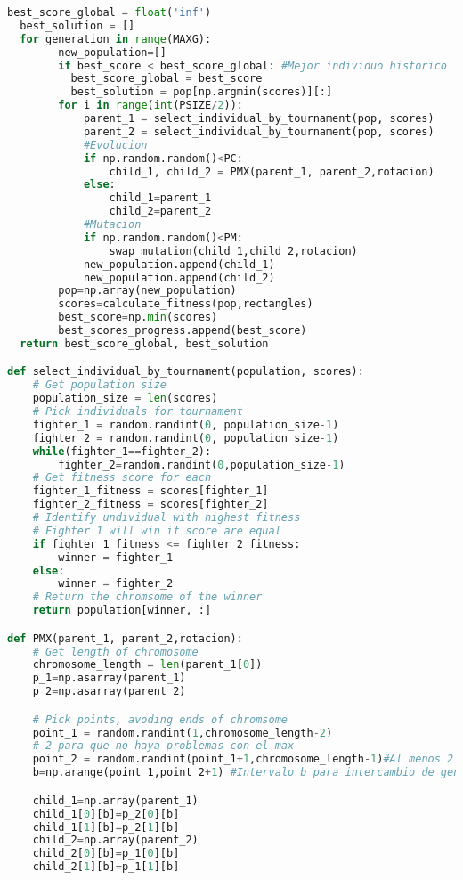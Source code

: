 \documentclass[10pt]{article}
\begin{document}
\begin{lstlisting}[language=Python]
  best_score_global = float('inf')
  best_solution = []
  for generation in range(MAXG):
        new_population=[]
        if best_score < best_score_global: #Mejor individuo historico
          best_score_global = best_score
          best_solution = pop[np.argmin(scores)][:]
        for i in range(int(PSIZE/2)):
            parent_1 = select_individual_by_tournament(pop, scores)
            parent_2 = select_individual_by_tournament(pop, scores)
            #Evolucion
            if np.random.random()<PC:
                child_1, child_2 = PMX(parent_1, parent_2,rotacion)
            else:
                child_1=parent_1
                child_2=parent_2
            #Mutacion
            if np.random.random()<PM:
                swap_mutation(child_1,child_2,rotacion)
            new_population.append(child_1)
            new_population.append(child_2)
        pop=np.array(new_population)
        scores=calculate_fitness(pop,rectangles)
        best_score=np.min(scores)
        best_scores_progress.append(best_score)
  return best_score_global, best_solution

def select_individual_by_tournament(population, scores):
    # Get population size
    population_size = len(scores)
    # Pick individuals for tournament
    fighter_1 = random.randint(0, population_size-1)
    fighter_2 = random.randint(0, population_size-1)
    while(fighter_1==fighter_2):
        fighter_2=random.randint(0,population_size-1)
    # Get fitness score for each
    fighter_1_fitness = scores[fighter_1]
    fighter_2_fitness = scores[fighter_2]
    # Identify undividual with highest fitness
    # Fighter 1 will win if score are equal
    if fighter_1_fitness <= fighter_2_fitness:
        winner = fighter_1
    else:
        winner = fighter_2
    # Return the chromsome of the winner
    return population[winner, :]

def PMX(parent_1, parent_2,rotacion):
    # Get length of chromosome
    chromosome_length = len(parent_1[0])
    p_1=np.asarray(parent_1)
    p_2=np.asarray(parent_2)

    # Pick points, avoding ends of chromsome 
    point_1 = random.randint(1,chromosome_length-2)
    #-2 para que no haya problemas con el max
    point_2 = random.randint(point_1+1,chromosome_length-1)#Al menos 2
    b=np.arange(point_1,point_2+1) #Intervalo b para intercambio de genes

    child_1=np.array(parent_1)
    child_1[0][b]=p_2[0][b]
    child_1[1][b]=p_2[1][b]
    child_2=np.array(parent_2)
    child_2[0][b]=p_1[0][b]
    child_2[1][b]=p_1[1][b]
    

\end{lstlisting}
\end{document}
